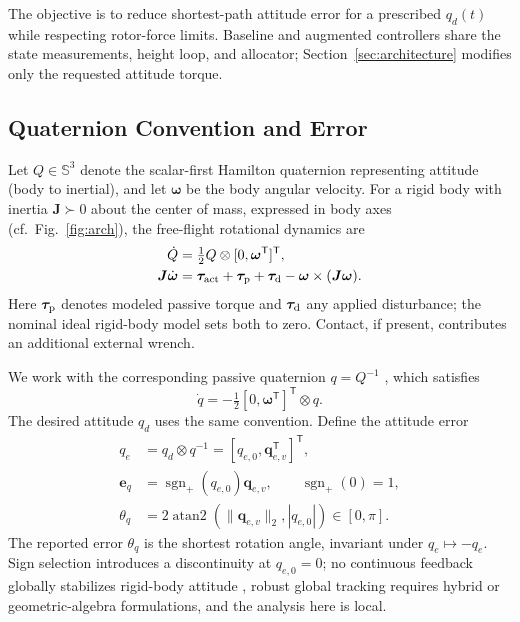 \documentclass[letterpaper, 10 pt, conference]{ieeeconf}
\newcommand{\T}{^{\mathsf T}}
\newcommand{\sgnp}{\operatorname{sgn}_{+}}
\begin{document}
The objective is to reduce shortest-path attitude error for a prescribed
$q_d(t)$ while respecting rotor-force limits. Baseline and augmented
controllers share the state measurements, height loop, and allocator;
Section~\ref{sec:architecture} modifies only the requested attitude torque.

%

\subsection{Quaternion Convention and Error}
Let $Q\in\mathbb S^3$ denote the scalar-first Hamilton quaternion representing attitude (body to inertial), and let $\bm\omega$ be the body angular velocity. For a rigid body with inertia $\bm J\succ0$ about the center of mass, expressed in body axes (cf.~Fig.~\ref{fig:arch}), the free-flight rotational dynamics are \cite{schaub2018amss}
\begin{align}
 \dot Q&=\tfrac12 Q\otimes[0,\bm\omega\T]\T,\\
 \bm J\dot{\bm\omega}&=\bm\tau_{\rm act}+\bm\tau_{\rm p}
       +\bm\tau_{\rm d}-\bm\omega\times(\bm J\bm\omega).
 \label{eq:plant}
\end{align}
Here $\bm\tau_{\rm p}$ denotes modeled passive torque and $\bm\tau_{\rm d}$ any applied disturbance; the nominal ideal rigid-body model sets both to zero. Contact, if present, contributes an additional external wrench.

We work with the corresponding passive quaternion $q=Q^{-1}$ \cite{diebel2006quaternion}, which satisfies
\begin{equation}
 \dot q=-\tfrac12[0,\bm\omega\T]\T\otimes q.
 \label{eq:passive}
\end{equation}
The desired attitude $q_d$ uses the same convention. Define the attitude error
\begin{align}
 q_e&=q_d\otimes q^{-1}=[q_{e,0},\bm q_{e,v}\T]\T,\\
 \bm e_q&=\sgnp(q_{e,0})\bm q_{e,v},\qquad \sgnp(0)=1,\\
 \theta_q&=2\operatorname{atan2}(\|\bm q_{e,v}\|_2,|q_{e,0}|)
             \in[0,\pi].
 \label{eq:theta}
\end{align}
The reported error $\theta_q$ is the shortest rotation angle, invariant under $q_e\mapsto-q_e$. Sign selection introduces a discontinuity at $q_{e,0}=0$; no continuous feedback globally stabilizes rigid-body attitude \cite{bhat2000topological,chaturvedi2011rigid}, robust global tracking requires hybrid \cite{mayhew2011hybrid} or geometric-algebra \cite{rubioscola2026ga,escamilla2023ga} formulations, and the analysis here is local.
\end{document}
